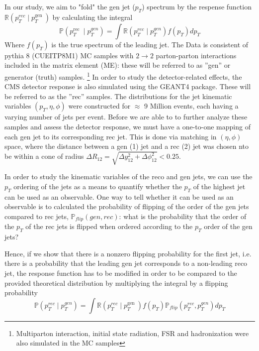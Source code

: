 In our study, we aim to "fold" the gen jet ($p_T$) spectrum by the respense function  $\mathbb{R}\left(p_{T}^{r e c} \mid p_{T}^{\text {gen }}\right)$ by calculating the integral 
\begin{equation}
    \mathbb{P}\left(p_{T}^{\text {rec }} \mid p_{T}^{g e n}\right)=\int \mathbb{R}\left(p_{T}^{r e c} \mid p_{T}^{g e n}\right) f\left(p_{T}\right) d p_{T}
\end{equation}
Where $f(p_T)$ is the true spectrum of the leading jet. The Data is consistent of pythia 8 (CUEITP8M1) MC samples with $2 \rightarrow 2$ parton-parton interactions included
in the matrix element (ME): these will be referred to as ”gen” or generator (truth) samples. \footnote{Multiparton interaction, initial state
radiation, FSR and hadronization were also simulated in the MC samples}
In order to study the detector-related effects, the CMS detector
response is also simulated using the GEANT4 package. These will be referred to as the ”rec” samples. The distributions for the jet kinematic variables $\left(p_{T}, \eta, \phi\right)$ were constructed for $\approx$ 9 Million events, each having a varying number of jets per event. Before we are able to to further analyze these samples and assess the detector response, we must have a one-to-one mapping of each gen jet to its corresponding rec jet. This is done via matching in $(\eta, \phi)$ space, where the distance between a gen (1) jet and a rec (2) jet was chosen nto be within a cone of radius $\Delta R_{12}=\sqrt{\Delta y_{12}^{2}+\Delta \phi_{12}^{2}} < 0.25$.

In order to study the kinematic variables of the reco and gen jets, we can
use the $p_T$ ordering of the jets as a means to quantify whether the $p_T$ of the highest jet can be used as an observable. One way to tell whether it can be used as an observable is to calculated the probability of flipping of the order of the gen jets compared to rec jets, $\mathbb{P}_{f l i p}(g e n, r e c)$: what is the probability that the order of the $p_T$ of the rec jets is flipped when ordered according to the $p_T$ order of the gen jets?

Hence, if we show that there is a nonzero flipping probability for the first jet, i.e. there is a probability that the leading gen jet corresponds to a non-leading reco jet, the response
function has to be modified in order to be compared to the provided
theoretical distribution by multiplying the integral by a flipping probability
\begin{equation}
    \mathbb{P}\left(p_{T}^{r e c} \mid p_{T}^{g e n}\right)=\int \mathbb{R}\left(p_{T}^{r e c} \mid p_{T}^{\text {gen }}\right) f\left(p_{T}\right) \mathbb{P}_{f l i p}\left(p_{T}^{r e c}, p_{T}^{g e n}\right) d p_{T}
\end{equation}

